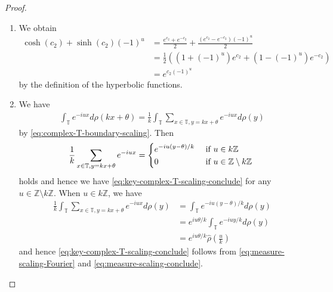 \documentclass[12pt]{article}
\theoremstyle{definition}
\theoremstyle{remark}
\numberwithin{equation}{section}
\numberwithin{figure}{section}
\numberwithin{table}{section}
\begin{document}
\begin{proof}

\begin{enumerate}
    \item 
    We obtain
\begin{align}
    \cosh ( c_2 ) + \sinh ( c_2 ) ( - 1 )^u
    & = \frac{ e^{ c_2 } + e^{ - c_2 } }{ 2 } + \frac{ ( e^{ c_2 } - e^{ - c_2 } ) ( - 1 )^u }{ 2 } \\
    & = \frac{ 1 }{ 2 } ( ( 1 + ( - 1 )^u ) e^{ c_2 } + ( 1 - ( - 1 )^u ) e^{ - c_2 } ) \\
    & = e^{ c_2 ( - 1 )^u }
\end{align}
by the definition of the hyperbolic functions.

\item
We have
\begin{align}
    \int_{ \mathbb{ T } } e^{ - i u x } d \rho ( k x + \theta )
    = \frac{ 1 }{ k } \int_{ \mathbb{ T } } \sum_{ x \in \mathbb{ T }, y = k x + \theta } e^{ - i u x } d \rho ( y ) \label{eq:measure-scaling-Fourier}
\end{align}
by \eqref{eq:complex-T-boundary-scaling}.
Then
\begin{align}
    \frac{ 1 }{ k } \sum_{ x \in \mathbb{ T }, y = k x + \theta } e^{ - i u x }
    = \left\{ 
    \begin{aligned}
        & e^{ - i u ( y - \theta ) / k } & & \text{ if $ u \in k \mathbb{ Z } $ } \\
        & 0 & & \text{ if $ u \in \mathbb{ Z } \setminus k \mathbb{ Z } $ }
    \end{aligned}
    \right.
\end{align}
holds and hence we have \eqref{eq:key-complex-T-scaling-conclude} for any $ u \in \mathbb{ Z } \setminus k \mathbb{ Z } $.
When $ u \in k \mathbb{ Z } $, we have
\begin{align}
   \frac{ 1 }{ k } \int_{ \mathbb{ T } } \sum_{ x \in \mathbb{ T }, y = k x + \theta } e^{ - i u x } d \rho ( y )
   & = \int_{ \mathbb{ T } } e^{ - i u ( y - \theta ) / k } d \rho ( y ) \\
   & = e^{ i u \theta / k } \int_{ \mathbb{ T } } e^{ - i u y / k } d \rho ( y ) \\
   & = e^{ i u \theta / k } \hat{ \rho } \left( \frac{ u }{ k } \right) \label{eq:measure-scaling-conclude}
\end{align}
and hence \eqref{eq:key-complex-T-scaling-conclude} follows from \eqref{eq:measure-scaling-Fourier} and \eqref{eq:measure-scaling-conclude}.


\end{enumerate}
\end{proof}
\end{document}
